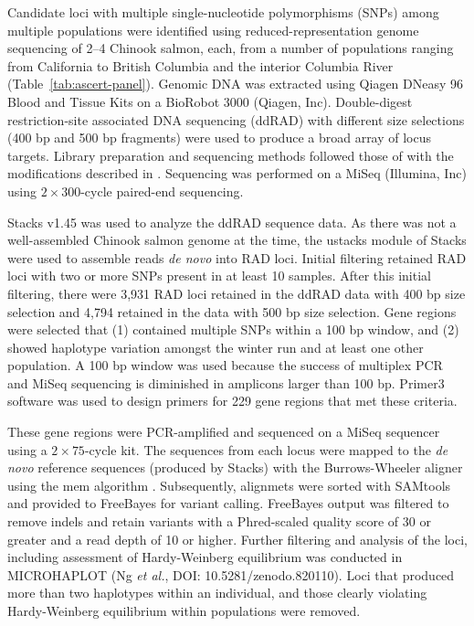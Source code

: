 Candidate loci with multiple single-nucleotide polymorphisms (SNPs) among multiple
populations were identified using reduced-representation genome sequencing of 2--4 Chinook salmon, each, from a number of
populations ranging from California to British
Columbia and the interior Columbia River (Table~\ref{tab:ascert-panel}).
Genomic DNA was extracted using Qiagen DNeasy 96 Blood and Tissue Kits on a BioRobot 3000
(Qiagen, Inc). Double-digest restriction-site associated DNA sequencing (ddRAD) with different size selections (400 bp and 500 bp
fragments) were used to produce a broad array of locus targets. Library preparation and sequencing methods followed those of
\citet{peterson2012double} with the modifications described in \citep{baetscher2018microhaplotypes}.
Sequencing was performed on a MiSeq (Illumina, Inc) using $2 \times 300$-cycle paired-end sequencing.

Stacks v1.45 \citep{catchen2013stacks} was used to analyze the ddRAD sequence data.  As there was not a well-assembled Chinook salmon genome
at the time, the ustacks module of Stacks were used to assemble reads {\em de novo} into RAD loci.  Initial filtering retained RAD loci with two or more SNPs present
in at least 10 samples. After this initial filtering, there were 3,931 RAD loci retained in the ddRAD data with 400 bp size selection and
4,794 retained in the data with 500 bp size selection.
Gene regions were selected that (1) contained multiple SNPs within a 100 bp window, and (2) showed haplotype variation amongst the winter run and at least one other population.
A 100 bp window was used because the success of multiplex PCR and MiSeq sequencing is diminished in amplicons larger than 100 bp. Primer3
software \citep{untergasser2012primer3} was used to design primers for 229 gene regions that met these criteria.

These gene regions were PCR-amplified and sequenced on a MiSeq sequencer using a $2\times 75$-cycle kit.
The sequences from each locus were mapped to the {\em de novo} reference sequences (produced by Stacks) with
the Burrows-Wheeler aligner using the mem algorithm \citep{bwa-mem2009}. 
Subsequently, alignmets were sorted with SAMtools \citep{li2009sequence} and provided to
FreeBayes \citep{garrison2012haplotype} for variant calling.
FreeBayes output was filtered to remove indels and retain variants with a Phred-scaled quality score of 30
or greater and a read depth of 10 or higher. Further filtering and analysis of the loci, including
assessment of Hardy-Weinberg equilibrium \citep{hardy1908mendelian} was conducted in MICROHAPLOT (Ng {\em et al.}, DOI: 10.5281/zenodo.820110).  Loci that produced more than two haplotypes within an individual, and those clearly violating Hardy-Weinberg equilibrium within populations were removed.



